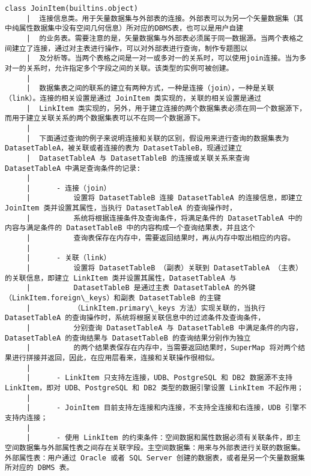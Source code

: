 \documentclass[11pt]{article}
\begin{document}
\begin{Verbatim}[commandchars=\\\{\}]
    class JoinItem(builtins.object)
     |  连接信息类。用于矢量数据集与外部表的连接。外部表可以为另一个矢量数据集（其中纯属性数据集中没有空间几何信息）所对应的DBMS表，也可以是用户自建
     |  的业务表。需要注意的是，矢量数据集与外部表必须属于同一数据源。当两个表格之间建立了连接，通过对主表进行操作，可以对外部表进行查询，制作专题图以
     |  及分析等。当两个表格之间是一对一或多对一的关系时，可以使用join连接。当为多对一的关系时，允许指定多个字段之间的关联。该类型的实例可被创建。
     |  
     |  数据集表之间的联系的建立有两种方式，一种是连接（join），一种是关联（link）。连接的相关设置是通过 JoinItem 类实现的，关联的相关设置是通过
     |  LinkItem 类实现的，另外，用于建立连接的两个数据集表必须在同一个数据源下，而用于建立关联关系的两个数据集表可以不在同一个数据源下。
     |  
     |  下面通过查询的例子来说明连接和关联的区别，假设用来进行查询的数据集表为 DatasetTableA，被关联或者连接的表为 DatasetTableB，现通过建立
     |  DatasetTableA 与 DatasetTableB 的连接或关联关系来查询 DatasetTableA 中满足查询条件的记录:
     |  
     |      - 连接（join）
     |          设置将 DatasetTableB 连接 DatasetTableA 的连接信息，即建立 JoinItem 类并设置其属性，当执行 DatasetTableA 的查询操作时，
     |          系统将根据连接条件及查询条件，将满足条件的 DatasetTableA 中的内容与满足条件的 DatasetTableB 中的内容构成一个查询结果表，并且这个
     |          查询表保存在内存中，需要返回结果时，再从内存中取出相应的内容。
     |  
     |      - 关联（link）
     |          设置将 DatasetTableB （副表）关联到 DatasetTableA （主表）的关联信息，即建立 LinkItem 类并设置其属性，DatasetTableA 与
     |          DatasetTableB 是通过主表 DatasetTableA 的外键（LinkItem.foreign\_keys）和副表 DatasetTableB 的主键
     |          （LinkItem.primary\_keys 方法）实现关联的，当执行 DatasetTableA 的查询操作时，系统将根据关联信息中的过滤条件及查询条件，
     |          分别查询 DatasetTableA 与 DatasetTableB 中满足条件的内容，DatasetTableA 的查询结果与 DatasetTableB 的查询结果分别作为独立
     |          的两个结果表保存在内存中，当需要返回结果时，SuperMap 将对两个结果进行拼接并返回，因此，在应用层看来，连接和关联操作很相似。
     |  
     |      - LinkItem 只支持左连接，UDB、PostgreSQL 和 DB2 数据源不支持 LinkItem，即对 UDB、PostgreSQL 和 DB2 类型的数据引擎设置 LinkItem 不起作用；
     |  
     |      - JoinItem 目前支持左连接和内连接，不支持全连接和右连接，UDB 引擎不支持内连接；
     |  
     |      - 使用 LinkItem 的约束条件：空间数据和属性数据必须有关联条件，即主空间数据集与外部属性表之间存在关联字段。主空间数据集：用来与外部表进行关联的数据集。外部属性表：用户通过 Oracle 或者 SQL Server 创建的数据表，或者是另一个矢量数据集所对应的 DBMS 表。

\end{Verbatim}
\end{document}
